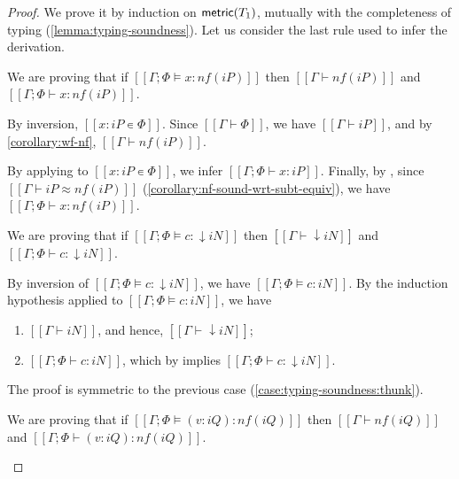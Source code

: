 \begin{proof}
    We prove it by induction on $\mathsf{metric}(T_1)$, mutually with 
    the completeness of typing (\cref{lemma:typing-soundness}).
    Let us consider the last rule used to infer the derivation.
    \begin{caseof}
        \item {}
            We are proving that if $[[Γ; Φ ⊨ x : nf(iP)]]$
            then $[[Γ ⊢ nf(iP)]]$ and $[[Γ; Φ ⊢ x : nf(iP)]]$.

            By inversion, $[[x : iP ∊ Φ]]$.
            Since $[[Γ ⊢ Φ]]$, we have $[[Γ ⊢ iP]]$,
            and by \cref{corollary:wf-nf}, $[[Γ ⊢ nf(iP)]]$.

            By applying 
            to $[[x : iP ∊ Φ]]$, we infer $[[Γ; Φ ⊢ x : iP]]$.
            Finally, by , 
            since $[[Γ ⊢ iP ≈ nf(iP)]]$ 
            (\cref{corollary:nf-sound-wrt-subt-equiv}),
            we have $[[Γ; Φ ⊢ x : nf(iP)]]$.

        \item {}
            \label{case:typing-soundness:thunk}

            We are proving that if $[[Γ; Φ ⊨ {c} : ↓iN]]$
            then $[[Γ ⊢ ↓iN]]$ and $[[Γ; Φ ⊢ {c} : ↓iN]]$.

            By inversion of $[[Γ; Φ ⊨ {c} : ↓iN]]$, 
            we have $[[Γ; Φ ⊨ c : iN]]$.
            By the induction hypothesis applied to $[[Γ; Φ ⊨ c : iN]]$,
            we have 
            \begin{enumerate}
                \item $[[Γ ⊢ iN]]$, and hence, $[[Γ ⊢ ↓iN]]$;
                \item $[[Γ; Φ ⊢ c : iN]]$, 
                    which by  implies
                    $[[Γ; Φ ⊢ {c} : ↓iN]]$.
            \end{enumerate}

        \item {}
            The proof is symmetric to the previous case
            (\cref{case:typing-soundness:thunk}).

        \item {}
            \label{case:typing-soundness:pos-annot}
            We are proving that if $[[Γ; Φ ⊨ (v : iQ) : nf(iQ)]]$
            then $[[Γ ⊢ nf(iQ)]]$ and $[[Γ; Φ ⊢ (v : iQ) : nf(iQ)]]$.


\end{caseof}
\end{proof}
